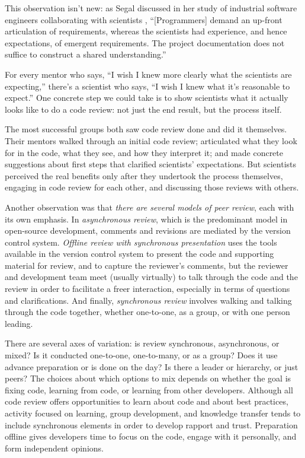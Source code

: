 \documentclass[10pt,twocolumn]{article}
\begin{document}
This observation isn't new:
as Segal discussed in her study of industrial software engineers collaborating with scientists \cite{b:segal2005},
``[Programmers] demand an up-front articulation of requirements,
whereas the scientists had experience, and hence expectations, of emergent requirements.
The project documentation does not suffice to construct a shared understanding.''

For every mentor who says,
``I wish I knew more clearly what the scientists are expecting,''
there's a scientist who says,
``I wish I knew what it's reasonable to expect.''
One concrete step we could take is to show scientists what it actually looks like to do a code review:
not just the end result, but the process itself.

The most successful groups both saw code review done and did it themselves.
Their mentors walked through an initial code review;
articulated what they look for in the code, what they see, and how they interpret it;
and made concrete suggestions about first steps that clarified scientists' expectations.
But scientists perceived the real benefits only after they undertook the process themselves,
engaging in code review for each other,
and discussing those reviews with others.

Another observation was that \emph{there are several models of peer review},
each with its own emphasis.
In \emph{asynchronous review},
which is the predominant model in open-source development,
comments and revisions are mediated by the version control system.
\emph{Offline review with synchronous presentation}
uses the tools available in the version control system to present the code and supporting material for review,
and to capture the reviewer's comments,
but the reviewer and development team meet (usually virtually) to talk through the code and the review
in order to facilitate a freer interaction,
especially in terms of questions and clarifications.
And finally,
\emph{synchronous review}
involves walking and talking through the code together,
whether one-to-one, as a group, or with one person leading.

There are several axes of variation:
is review synchronous, asynchronous, or mixed?
Is it conducted one-to-one, one-to-many, or as a group?
Does it use advance preparation or is done on the day?
Is there a leader or hierarchy, or just peers?
The choices about which options to mix depends on whether the goal is
fixing code, learning from code, or learning from other developers.
Although all code review offers opportunities to learn about code and about best practices,
activity focused on learning, group development, and knowledge transfer tends to include synchronous elements
in order to develop rapport and trust.
Preparation offline gives developers time to focus on the code,
engage with it personally,
and form independent opinions. 
\end{document}
